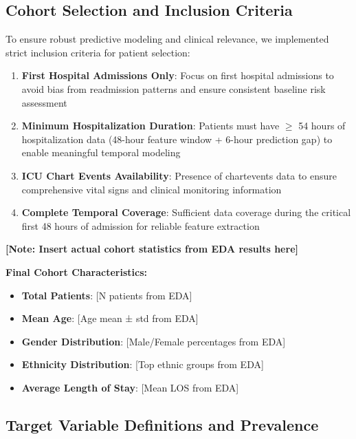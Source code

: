 \documentclass[11pt]{article}
\begin{document}
\subsection{Cohort Selection and Inclusion Criteria}

To ensure robust predictive modeling and clinical relevance, we implemented strict inclusion criteria for patient selection:

\begin{enumerate}
    \item \textbf{First Hospital Admissions Only}: Focus on first hospital admissions to avoid bias from readmission patterns and ensure consistent baseline risk assessment
    
    \item \textbf{Minimum Hospitalization Duration}: Patients must have $\geq$ 54 hours of hospitalization data (48-hour feature window + 6-hour prediction gap) to enable meaningful temporal modeling
    
    \item \textbf{ICU Chart Events Availability}: Presence of chartevents data to ensure comprehensive vital signs and clinical monitoring information
    
    \item \textbf{Complete Temporal Coverage}: Sufficient data coverage during the critical first 48 hours of admission for reliable feature extraction
\end{enumerate}

\textbf{[Note: Insert actual cohort statistics from EDA results here]}

\textbf{Final Cohort Characteristics:}
\begin{itemize}
    \item \textbf{Total Patients}: [N patients from EDA]
    \item \textbf{Mean Age}: [Age mean ± std from EDA]
    \item \textbf{Gender Distribution}: [Male/Female percentages from EDA]
    \item \textbf{Ethnicity Distribution}: [Top ethnic groups from EDA]
    \item \textbf{Average Length of Stay}: [Mean LOS from EDA]
\end{itemize}

\subsection{Target Variable Definitions and Prevalence}
\end{document}
